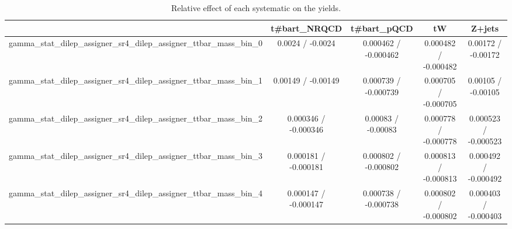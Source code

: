 \documentclass[10pt]{article}
\begin{document}
\begin{table}[htbp]
\begin{center}
\begin{tabular}{|c|c|c|c|c|}
\hline 
      & t#bar{t}_{NRQCD}      & t#bar{t}_{pQCD}      & tW      & Z+jets \\ 
\hline 
  gamma_stat_dilep_assigner_sr4_dilep_assigner_ttbar_mass_bin_0 & 0.0024 / -0.0024 & 0.000462 / -0.000462 & 0.000482 / -0.000482 & 0.00172 / -0.00172 \\ 
  gamma_stat_dilep_assigner_sr4_dilep_assigner_ttbar_mass_bin_1 & 0.00149 / -0.00149 & 0.000739 / -0.000739 & 0.000705 / -0.000705 & 0.00105 / -0.00105 \\ 
  gamma_stat_dilep_assigner_sr4_dilep_assigner_ttbar_mass_bin_2 & 0.000346 / -0.000346 & 0.00083 / -0.00083 & 0.000778 / -0.000778 & 0.000523 / -0.000523 \\ 
  gamma_stat_dilep_assigner_sr4_dilep_assigner_ttbar_mass_bin_3 & 0.000181 / -0.000181 & 0.000802 / -0.000802 & 0.000813 / -0.000813 & 0.000492 / -0.000492 \\ 
  gamma_stat_dilep_assigner_sr4_dilep_assigner_ttbar_mass_bin_4 & 0.000147 / -0.000147 & 0.000738 / -0.000738 & 0.000802 / -0.000802 & 0.000403 / -0.000403 \\ 
\hline 
\end{tabular} 
\caption{Relative effect of each systematic on the yields.} 
\end{center} 
\end{table} 
\end{document}
